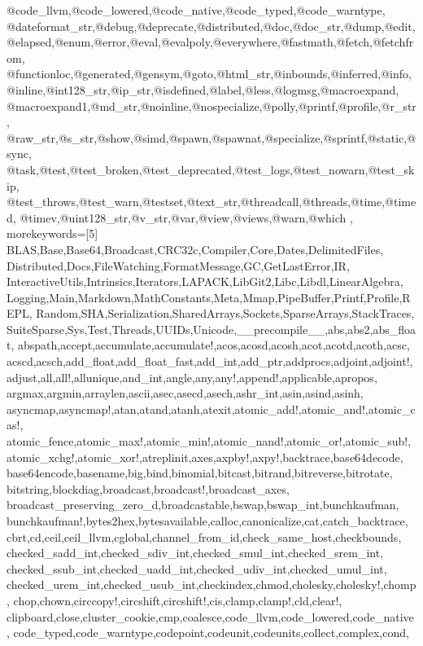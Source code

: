 {{@code_llvm,@code_lowered,@code_native,@code_typed,@code_warntype,%
@dateformat_str,@debug,@deprecate,@distributed,@doc,@doc_str,@dump,@edit,%
@elapsed,@enum,@error,@eval,@evalpoly,@everywhere,@fastmath,@fetch,@fetchfrom,%
@functionloc,@generated,@gensym,@goto,@html_str,@inbounds,@inferred,@info,%
@inline,@int128_str,@ip_str,@isdefined,@label,@less,@logmsg,@macroexpand,%
@macroexpand1,@md_str,@noinline,@nospecialize,@polly,@printf,@profile,@r_str,%
@raw_str,@s_str,@show,@simd,@spawn,@spawnat,@specialize,@sprintf,@static,@sync,%
@task,@test,@test_broken,@test_deprecated,@test_logs,@test_nowarn,@test_skip,%
@test_throws,@test_warn,@testset,@text_str,@threadcall,@threads,@time,@timed,%
@timev,@uint128_str,@v_str,@var,@view,@views,@warn,@which%
},%
%
%
morekeywords=[5]
{%
BLAS,Base,Base64,Broadcast,CRC32c,Compiler,Core,Dates,DelimitedFiles,%
Distributed,Docs,FileWatching,FormatMessage,GC,GetLastError,IR,%
InteractiveUtils,Intrinsics,Iterators,LAPACK,LibGit2,Libc,Libdl,LinearAlgebra,%
Logging,Main,Markdown,MathConstants,Meta,Mmap,PipeBuffer,Printf,Profile,REPL,%
Random,SHA,Serialization,SharedArrays,Sockets,SparseArrays,StackTraces,%
SuiteSparse,Sys,Test,Threads,UUIDs,Unicode,__precompile__,abs,abs2,abs_float,%
abspath,accept,accumulate,accumulate!,acos,acosd,acosh,acot,acotd,acoth,acsc,%
acscd,acsch,add_float,add_float_fast,add_int,add_ptr,addprocs,adjoint,adjoint!,%
adjust,all,all!,allunique,and_int,angle,any,any!,append!,applicable,apropos,%
argmax,argmin,arraylen,ascii,asec,asecd,asech,ashr_int,asin,asind,asinh,%
asyncmap,asyncmap!,atan,atand,atanh,atexit,atomic_add!,atomic_and!,atomic_cas!,%
atomic_fence,atomic_max!,atomic_min!,atomic_nand!,atomic_or!,atomic_sub!,%
atomic_xchg!,atomic_xor!,atreplinit,axes,axpby!,axpy!,backtrace,base64decode,%
base64encode,basename,big,bind,binomial,bitcast,bitrand,bitreverse,bitrotate,%
bitstring,blockdiag,broadcast,broadcast!,broadcast_axes,%
broadcast_preserving_zero_d,broadcastable,bswap,bswap_int,bunchkaufman,%
bunchkaufman!,bytes2hex,bytesavailable,calloc,canonicalize,cat,catch_backtrace,%
cbrt,cd,ceil,ceil_llvm,cglobal,channel_from_id,check_same_host,checkbounds,%
checked_sadd_int,checked_sdiv_int,checked_smul_int,checked_srem_int,%
checked_ssub_int,checked_uadd_int,checked_udiv_int,checked_umul_int,%
checked_urem_int,checked_usub_int,checkindex,chmod,cholesky,cholesky!,chomp,%
chop,chown,circcopy!,circshift,circshift!,cis,clamp,clamp!,cld,clear!,%
clipboard,close,cluster_cookie,cmp,coalesce,code_llvm,code_lowered,code_native,%
code_typed,code_warntype,codepoint,codeunit,codeunits,collect,complex,cond,%
}}
